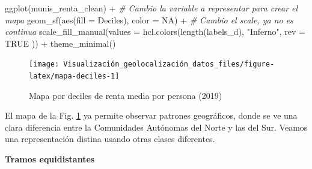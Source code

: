 \documentclass[
]{book}
\newenvironment{Shaded}{\begin{snugshade}}{\end{snugshade}}
\newcommand{\AttributeTok}[1]{\textcolor[rgb]{0.77,0.63,0.00}{#1}}
\newcommand{\CommentTok}[1]{\textcolor[rgb]{0.56,0.35,0.01}{\textit{#1}}}
\newcommand{\ConstantTok}[1]{\textcolor[rgb]{0.00,0.00,0.00}{#1}}
\newcommand{\FunctionTok}[1]{\textcolor[rgb]{0.00,0.00,0.00}{#1}}
\newcommand{\NormalTok}[1]{#1}
\newcommand{\OtherTok}[1]{\textcolor[rgb]{0.56,0.35,0.01}{#1}}
\newcommand{\SpecialCharTok}[1]{\textcolor[rgb]{0.00,0.00,0.00}{#1}}
\newcommand{\StringTok}[1]{\textcolor[rgb]{0.31,0.60,0.02}{#1}}
\theoremstyle{definition}
\theoremstyle{definition}
\theoremstyle{definition}
\theoremstyle{definition}
\theoremstyle{remark}
\begin{document}
\begin{Shaded}
\begin{Highlighting}[]
\FunctionTok{ggplot}\NormalTok{(munis\_renta\_clean) }\SpecialCharTok{+}
  \CommentTok{\# Cambio la variable a representar para crear el mapa}
  \FunctionTok{geom\_sf}\NormalTok{(}\FunctionTok{aes}\NormalTok{(}\AttributeTok{fill =}\NormalTok{ Deciles), }\AttributeTok{color =} \ConstantTok{NA}\NormalTok{) }\SpecialCharTok{+}
  \CommentTok{\# Cambio el scale, ya no es continua}
  \FunctionTok{scale\_fill\_manual}\NormalTok{(}\AttributeTok{values =} \FunctionTok{hcl.colors}\NormalTok{(}\FunctionTok{length}\NormalTok{(labels\_d),}
    \StringTok{"Inferno"}\NormalTok{,}
    \AttributeTok{rev =} \ConstantTok{TRUE}
\NormalTok{  )) }\SpecialCharTok{+}
  \FunctionTok{theme\_minimal}\NormalTok{()}
\end{Highlighting}
\end{Shaded}

\begin{figure}

{\centering \texttt{[image: Visualización\_geolocalización\_datos\_files/figure-latex/mapa-deciles-1]} 

}

\caption{Mapa por deciles de renta media por persona (2019)}\label{fig:mapa-deciles}
\end{figure}

El mapa de la Fig. \ref{fig:mapa-deciles} ya permite observar patrones
geográficos, donde se ve una clara diferencia entre la Comunidades Autónomas del
Norte y las del Sur. Veamos una representación distina usando otras clases
diferentes.

\textbf{Tramos equidistantes}

\begin{Shaded}
\end{Shaded}
\end{document}
